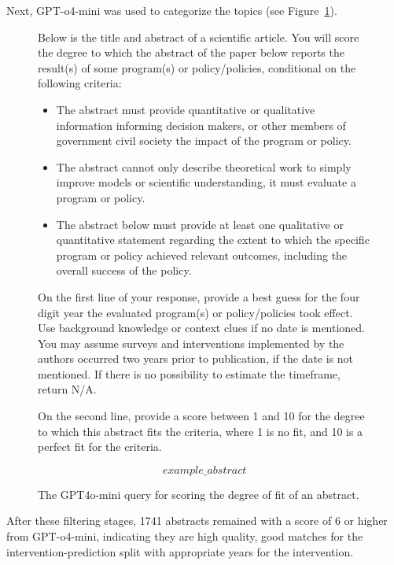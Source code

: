 \documentclass[12pt,a4paper]{article}
\begin{document}
Next, GPT-o4-mini was used to categorize the topics (see Figure~\ref{fig:scoringfigure}).

\begin{figure}[htbp]
  \centering
  \begin{tcolorbox}[left=4pt, right=4pt, top=4pt, bottom=4pt]
\ttfamily\footnotesize
Below is the title and abstract of a scientific article. 
You will score the degree to which the abstract of the paper below reports the result(s) of some program(s) or policy/policies, conditional on the following criteria: 

\begin{itemize}
 \item The abstract must provide quantitative or qualitative information informing decision makers, or other members of government civil society the impact of the program or policy. 
 \item The abstract cannot only describe theoretical work to simply improve models or scientific understanding, it must evaluate a program or policy. 
 \item The abstract below must provide at least one qualitative or quantitative statement regarding the extent to which the specific program or policy achieved relevant outcomes, including the overall success of the policy.  
\end{itemize}
On the first line of your response, provide a best guess for the four digit year the evaluated program(s) or policy/policies took effect. Use background knowledge or context clues if no date is mentioned. You may assume surveys and interventions implemented by the authors occurred two years prior to publication, if the date is not mentioned. If there is no possibility to estimate the timeframe, return N/A.

On the second line, provide a score between 1 and 10 for the degree to which this abstract fits the criteria, where 1 is no fit, and 10 is a perfect fit for the criteria.

\[example\_abstract\]
  \end{tcolorbox}
  \caption{The GPT4o-mini query for scoring the degree of fit of an abstract.}
  \label{fig:scoringfigure}
\end{figure}

After these filtering stages, 1741 abstracts remained with a score of 6 or higher from GPT-o4-mini, indicating they are high quality, good matches for the intervention-prediction split with appropriate years for the intervention.
\end{document}
